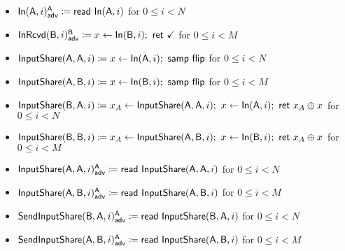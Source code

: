 \begin{itemize}
\item {\color{blue} $\mathsf{In}(\mathsf{A},i)^{\mathsf{A}}_{\mathsf{adv}} \coloneqq \mathsf{read} \ \mathsf{In}(\mathsf{A},i)$ for $0 \leq i < N$}
\item {\color{blue} $\mathsf{InRcvd}(\mathsf{B},i)^{\mathsf{B}}_{\mathsf{adv}} \coloneqq x \leftarrow \mathsf{In}(\mathsf{B},i); \ \mathsf{ret} \ \checkmark$ for $0 \leq i < M$}\smallskip
\item $\mathsf{InputShare}(\mathsf{A},\mathsf{A},i) \coloneqq x \leftarrow \mathsf{In}(\mathsf{A},i); \ \mathsf{samp} \ \mathsf{flip}$ for $0 \leq i < N$
\item {\color{red} $\mathsf{InputShare}(\mathsf{A},\mathsf{B},i) \coloneqq x \leftarrow \mathsf{In}(\mathsf{B},i); \ \mathsf{samp} \ \mathsf{flip}$ for $0 \leq i < M$}
\item {\color{red} $\InputShare(\B,\A,i) \coloneqq x_A \leftarrow \InputShare(\A,\A,i); \ x \leftarrow \In(\A,i); \ \ret{x_A \oplus x}$ for $0 \leq i < N$}
\item $\mathsf{InputShare}(\mathsf{B},\mathsf{B},i) \coloneqq x_A \leftarrow \mathsf{InputShare}(\mathsf{A},\mathsf{B},i); \ x \leftarrow \mathsf{In}(\mathsf{B},i); \  \mathsf{ret} \ x_A \oplus x$ for $0 \leq i < M$\smallskip
\item {\color{blue} $\mathsf{InputShare}(\mathsf{A},\mathsf{A},i)^{\mathsf{A}}_{\mathsf{adv}} \coloneqq \mathsf{read} \ \mathsf{InputShare}(\mathsf{A},\mathsf{A},i)$ for $0 \leq i < N$}
\item {\color{blue} $\mathsf{InputShare}(\mathsf{A},\mathsf{B},i)^{\mathsf{A}}_{\mathsf{adv}} \coloneqq \mathsf{read} \ \mathsf{InputShare}(\mathsf{A},\mathsf{B},i)$ for $0 \leq i < M$}\smallskip
\item {\color{blue} $\mathsf{SendInputShare}(\mathsf{B},\mathsf{A},i)^{\mathsf{A}}_{\mathsf{adv}} \coloneqq \mathsf{read} \ \mathsf{InputShare}(\mathsf{B},\mathsf{A},i)$ for $0 \leq i < N$}
\item {\color{blue} $\mathsf{SendInputShare}(\mathsf{A},\mathsf{B},i)^{\mathsf{A}}_{\mathsf{adv}} \coloneqq \mathsf{read} \ \mathsf{InputShare}(\mathsf{A},\mathsf{B},i)$ for $0 \leq i < M$}
\end{itemize}

